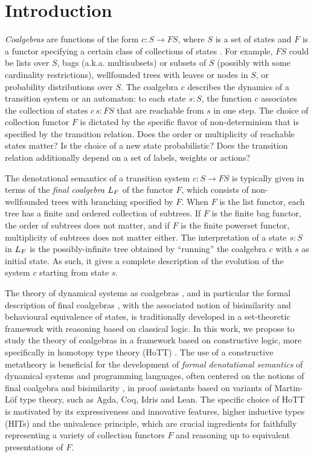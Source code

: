 \documentclass[a4paper,USenglish,cleveref]{lipics-v2021}
\begin{document}
\listoftodos

\section{Introduction}

\emph{Coalgebras} are functions of the form $c : S \to F S$, where $S$ is a set of states and $F$ is a functor specifying a certain class of collections of states \cite{Rutten2000,Jacobs2016}. For example, $F S$ could be lists over $S$, bags (a.k.a. multisubsets) or subsets of $S$ (possibly with some cardinality restrictions), wellfounded trees with leaves or nodes in $S$, or probability distributions over $S$. The coalgebra $c$ describes the dynamics of a transition system or an automaton: to each state $s : S$, the function $c$ associates the collection of states $c \,s : F S$ that are reachable from $s$ in one step. The choice of collection functor $F$ is dictated by the specific flavor of non-determinism that is specified by the transition relation. Does the order or multiplicity of reachable states matter? Is the choice of a new state probabilistic? Does the transition relation additionally depend on a set of labels, weights or actions?

The denotational semantics of a transition system $c : S \to F S$ is typically given in terms of the \emph{final coalgebra} $\Lim{F}$ of the functor $F$, which  consists of non-wellfounded trees with branching specified by $F$. When $F$ is the list functor, each tree has a finite and ordered collection of subtrees. If $F$ is the finite bag functor, the order of subtrees does not matter, and if $F$ is the finite powerset functor, multiplicity of subtrees does not matter either. %
The interpretation of a state $s : S$ in $\Lim{F}$ is the possibly-infinite tree obtained by ``running'' the coalgebra $c$ with $s$ as initial state. As such, it gives a complete description of the evolution of the system $c$ starting from state $s$.

The theory of dynamical systems as coalgebras \cite{Rutten2000,Jacobs2016}, and in particular the formal description of final coalgebras \cite{Barr1993,Adamek1995,Worrell2005}, with the associated notion of bisimilarity and behavioural equivalence of states, is traditionally developed in a set-theoretic framework with reasoning based on classical logic. In this work, we propose to study the theory of coalgebras in a framework based on constructive logic, more specifically in homotopy type theory (HoTT) \cite{HoTTBook}. The use of a constructive metatheory is beneficial for the development of \emph{formal denotational semantics} of dynamical systems and programming languages, often centered on the notions of final coalgebra and bisimilarity \cite{Turi1997}, in proof assistants based on variants of Martin-L{\"o}f type theory, such as Agda, Coq, Idris and Lean. The specific choice of HoTT is motivated by its expressiveness and innovative features, higher inductive types (HITs) and the univalence principle, which are crucial ingredients for faithfully representing a variety of collection functors $F$ and reasoning up to equivalent presentations of $F$. 
\end{document}
